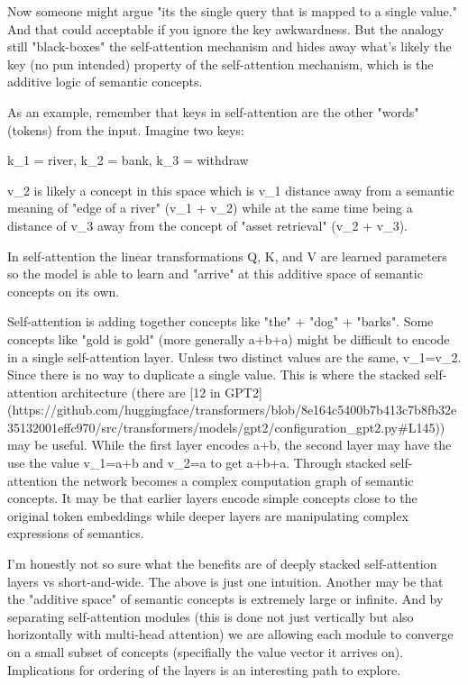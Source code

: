 Now someone might argue "its the single query that is mapped to a single value." And that could acceptable if you ignore the key awkwardness. But the analogy still "black-boxes" the self-attention mechanism and hides away what's likely the key (no pun intended) property of the self-attention mechanism, which is the additive logic of semantic concepts.

As an example, remember that keys in self-attention are the other "words" (tokens) from the input. Imagine two keys:

k_1 = river, k_2 = bank, k_3 = withdraw

v_2 is likely a concept in this space which is v_1 distance away from a semantic meaning of "edge of a river" (v_1 + v_2) while at the same time being a distance of v_3 away from the concept of "asset retrieval" (v_2 + v_3).

In self-attention the linear transformations Q, K, and V are learned parameters so the model is able to learn and "arrive" at this additive space of semantic concepts on its own.

Self-attention is adding together concepts like "the" + "dog" + "barks". Some concepts like "gold is gold" (more generally a+b+a) might be difficult to encode in a single self-attention layer. Unless two distinct values are the same, v_1=v_2. Since there is no way to duplicate a single value. This is where the stacked self-attention architecture (there are [12 in GPT2](https://github.com/huggingface/transformers/blob/8e164c5400b7b413c7b8fb32e35132001effc970/src/transformers/models/gpt2/configuration_gpt2.py#L145)) may be useful. While the first layer encodes a+b, the second layer may have the use the value v_1=a+b and v_2=a to get a+b+a. Through stacked self-attention the network becomes a complex computation graph of semantic concepts. It may be that earlier layers encode simple concepts close to the original token embeddings while deeper layers are manipulating complex expressions of semantics.

I'm honestly not so sure what the benefits are of deeply stacked self-attention layers vs short-and-wide. The above is just one intuition. Another may be that the "additive space" of semantic concepts is extremely large or infinite. And by separating self-attention modules (this is done not just vertically but also horizontally with multi-head attention) we are allowing each module to converge on a small subset of concepts (specifially the value vector it arrives on). Implications for ordering of the layers is an interesting path to explore.

